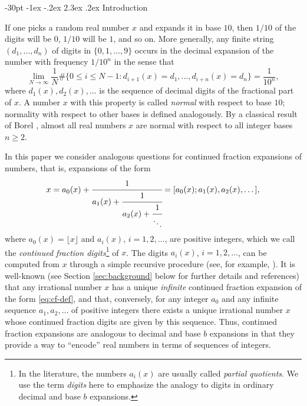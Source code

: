 \documentclass[10pt]{article}
\makeatletter
\renewcommand\section{\@startsection {section}{1}{\z@}
{-30pt \@plus -1ex \@minus -.2ex}
{2.3ex \@plus.2ex}
{\normalfont\normalsize\bfseries\boldmath}}
\theoremstyle{definition}
\numberwithin{equation}{section}
\numberwithin{lemma}{section}
\makeatother
\begin{document}
\pagestyle{myheadings}
\thispagestyle{empty}
\baselineskip=12.875pt
\vskip 30pt 




\section{Introduction}
\label{sec:intro}



If one picks a random real number $x$ and expands it in base
$10$, then $1/10$ of the digits will be $0$, $1/10$ will be $1$, and so
on. More generally, any finite string $(d_1,\dots,d_n)$
of digits in $\{0,1,\dots,9\}$
occurs in the decimal expansion of the number with frequency $1/10^n$
in the sense that 
\begin{equation}
\label{eq:decimal-normality-def}
\lim_{N\to\infty}\frac1N\#\{0\le i\le N-1: 
d_{i+1}(x)=d_1,\dots,d_{i+n}(x)=d_n\} =\frac{1}{10^n},
\end{equation}
where $d_1(x),d_2(x),\dots$ is the sequence of decimal digits of the
fractional part of $x$.   A number $x$ with this property is called
\emph{normal} with respect to base $10$; normality with respect to other
bases is defined analogously.  By a classical result of 
Borel \cite{borel1909}, almost all real numbers $x$ are
normal with respect to all integer bases $n\ge2$.  




In this paper we consider analogous questions for 
continued fraction expansions of numbers, that is, expansions of the form  
\begin{equation}
\label{eq:cf-def}
x=a_0(x)+
\cfrac{1}{a_1(x)+\cfrac{1}{a_2(x)+\cfrac{1}{\ddots}}} = [a_0(x);
a_1(x),a_2(x),\dots],
\end{equation}
where $a_0(x)=\lfloor x\rfloor$
and $a_i(x)$, $i=1,2,\dots$, are positive
integers, which we call the \emph{continued fraction digits}\footnote{%
In the literature, the numbers $a_i(x)$ are usually called \emph{partial
quotients}. We use the term \emph{digits} here to emphasize the
analogy to digits in ordinary decimal and base $b$ expansions.}
of $x$.  
The digits $a_i(x)$, $i=1,2,\dots$,  
can be computed from $x$ through a simple recursive procedure 
(see, for example,  \cite[Section 1.3]{dajani-kraaikamp-book}).
It is well-known (see Section \ref{sec:background} below for 
further details and references)
that any irrational number $x$ has a unique \emph{infinite}
continued fraction expansion of the form 
\eqref{eq:cf-def}, and that, conversely, for any integer $a_0$ and any 
infinite sequence $a_1,a_2,\dots$ 
of positive integers there exists a unique irrational
number $x$ whose continued fraction digits are given by this sequence. 
Thus, continued fraction expansions are analogous to decimal and base
$b$ expansions in that they provide a way to ``encode'' real numbers  in
terms of sequences of integers.
\end{document}
